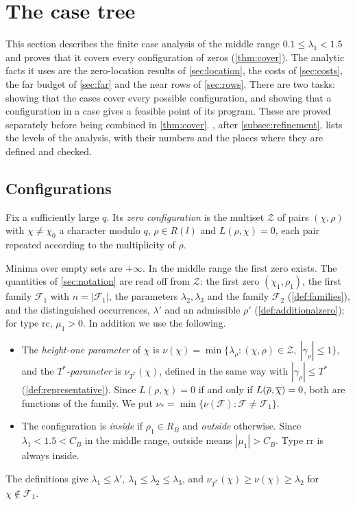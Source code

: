 \section{The case tree}\label{sec:casetree}

This section describes the finite case analysis of the middle range $0.1\le\lambda_1<1.5$ and
proves that it covers every configuration of zeros (\cref{thm:cover}). The analytic facts it
uses are the zero-location results of \cref{sec:location}, the costs of \cref{sec:costs}, the far
budget of \cref{sec:far} and the near rows of \cref{sec:rows}. There are two tasks:
showing that the cases cover every possible configuration, and showing that a
configuration in a case gives a feasible point of its program. These are proved
separately before being combined in \cref{thm:cover}. , after \cref{subsec:refinement}, lists the levels of the
analysis, with their numbers and the places where they are defined and checked.

\subsection{Configurations}\label{subsec:configurations}
\begin{definition}\label{def:configuration}
Fix a sufficiently large $q$. Its \emph{zero configuration} is the multiset $\mathcal Z$ of pairs $(\chi,\rho)$ with
$\chi\ne\chi_0$ a character modulo $q$, $\rho\in R(l)$ and $L(\rho,\chi)=0$, each pair repeated
according to the multiplicity of $\rho$.
\end{definition}

Minima over empty sets are $+\infty$. In the middle range the first zero exists.
The quantities of \cref{sec:notation} are read off from $\mathcal Z$: the first zero $(\chi_1,\rho_1)$,
the first family $\mathcal F_1$ with $n=|\mathcal F_1|$, the parameters $\lambda_2,\lambda_3$ and the family
$\mathcal F_2$ (\cref{def:families}), and the distinguished occurrences, $\lambda'$ and an admissible
$\rho'$ (\cref{def:additionalzero}); for type $\mathrm{rc}$, $\mu_1>0$. In addition we use the
following.
\begin{itemize}
  \item The \emph{height-one parameter} of $\chi$ is $\nu(\chi)=\min\{\lambda_\rho:(\chi,\rho)\in\mathcal
    Z,\ |\gamma_\rho|\le1\}$, and the \emph{$T^*$-parameter} is $\nu_{T^*}(\chi)$, defined in the same
    way with $|\gamma_\rho|\le T^*$ (\cref{def:representative}). Since $L(\rho,\chi)=0$ if and only if
    $L(\overline\rho,\overline{\chi})=0$, both are functions of the family. We put
    $\nu_*=\min\{\nu(\mathcal F):\mathcal F\ne\mathcal F_1\}$.
  \item The configuration is \emph{inside} if $\rho_1\in R_B$ and \emph{outside} otherwise. Since
    $\lambda_1<1.5<C_B$ in the middle range, outside means $|\mu_1|>C_B$. Type $\mathrm{rr}$ is
    always inside.
\end{itemize}
The definitions give $\lambda_1\le\lambda'$, $\lambda_1\le\lambda_2\le\lambda_3$, and
$\nu_{T^*}(\chi)\ge\nu(\chi)\ge\lambda_2$ for $\chi\notin \mathcal F_1$.

